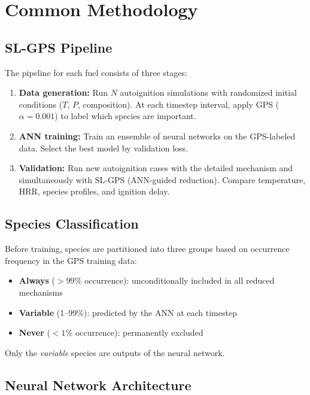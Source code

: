 \documentclass[11pt,a4paper]{article}
\begin{document}
\section{Common Methodology}
\label{sec:methodology}

\subsection{SL-GPS Pipeline}

The pipeline for each fuel consists of three stages:
\begin{enumerate}
    \item \textbf{Data generation:} Run $N$ autoignition simulations with randomized initial conditions ($T$, $P$, composition). At each timestep interval, apply GPS ($\alpha = 0.001$) to label which species are important.
    \item \textbf{ANN training:} Train an ensemble of neural networks on the GPS-labeled data. Select the best model by validation loss.
    \item \textbf{Validation:} Run new autoignition cases with the detailed mechanism and simultaneously with SL-GPS (ANN-guided reduction). Compare temperature, HRR, species profiles, and ignition delay.
\end{enumerate}

\subsection{Species Classification}

Before training, species are partitioned into three groups based on occurrence frequency in the GPS training data:
\begin{itemize}
    \item \textbf{Always} ($>99\%$ occurrence): unconditionally included in all reduced mechanisms
    \item \textbf{Variable} (1--99\%): predicted by the ANN at each timestep
    \item \textbf{Never} ($<1\%$ occurrence): permanently excluded
\end{itemize}
Only the \emph{variable} species are outputs of the neural network.

\subsection{Neural Network Architecture}
\end{document}
